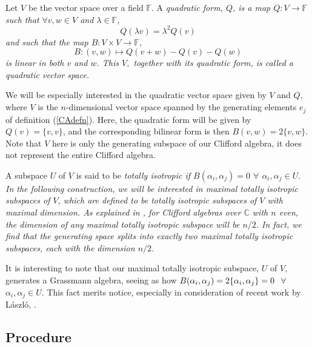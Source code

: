 \documentclass[letterpaper,12pt,titlepage,oneside,final]{book}
\begin{document}
Let $V$ be the vector space over a field $\mathbb{F}$.  A \it quadratic form, \rm $Q$, is a map $Q:V\rightarrow \mathbb{F}$ such that $\forall v, w\in V$ and $\lambda \in \mathbb{F}$, 
\begin{equation} Q(\lambda v) = \lambda^2 Q(v)
\end{equation}
\noindent and such that the map $B:V\times V\rightarrow \mathbb{F}$,
\begin{equation}B: (v,w) \mapsto Q(v+w)-Q(v)-Q(w)
\end{equation}
\noindent is linear in both $v$ and $w$.  This $V,$ together with its quadratic form, is called a \it quadratic vector space. \rm  

We will be especially interested in the quadratic vector space given by $V$ and $Q$, where $V$ is the $n$-dimensional vector space spanned by the generating elements $e_j$ of definition (\ref{CAdefn}).  Here, the quadratic form will be given by $Q(v) = \{v,v\}$, and the corresponding bilinear form is then $B(v,w) = 2\{v,w\}.$  Note that $V$ here is only the generating subspace of our Clifford algebra, it does not represent the entire Clifford algebra.



A subspace $U$ of $V$ is said to be \it totally isotropic \rm if $B(\alpha_i, \alpha_j)=0$ $\forall$ $\alpha_i, \alpha_j \in U.$  In the following construction, we will be interested in \it maximal totally isotropic subspaces \rm of $V$, which are defined to be totally isotropic subspaces of $V$ with maximal dimension.  As explained in \cite{ablam}, for Clifford algebras over $\mathbb{C}$ with $n$ even, the dimension of any maximal totally isotropic subspace will be $n/2$.  
In fact, we find that the generating space splits into exactly two maximal totally isotropic subspaces, each with the dimension $n/2$.

It is interesting to note that our maximal totally isotropic subspace, $U$ of $V,$ generates a Grassmann algebra, seeing as how $B(\alpha_i, \alpha_j)= 2\{\alpha_i,\alpha_j\}=0\hspace{1mm}$ $\forall$ $\alpha_i, \alpha_j \in U.$  This fact merits notice, especially in consideration of recent work by L\'{a}szl\'{o}, \cite{andras}.



\subsection{Procedure\label{proc}  }
\end{document}
